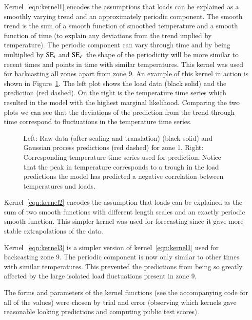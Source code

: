 \documentclass[preprint,authoryear,12pt]{elsarticle}
\newcommand{\acro}[1]{\textsc{#1}}
\def\SE{\acro{SE}}
\begin{document}
Kernel~\eqref{eqn:kernel1} encodes the assumptions that loads can be explained as a smoothly varying trend and an approximately periodic component.
The smooth trend is the sum of a smooth function of smoothed temperature and a smooth function of time (to explain any deviations from the trend implied by temperature).
The periodic component can vary through time and by being multiplied by $\SE_t$ and $\SE_T$ the shape of the periodicity will be more similar to recent times and points in time with similar temperatures.
This kernel was used for backcasting all zones apart from zone 9.
An example of this kernel in action is shown in Figure~\ref{fig:load_pred}.
The left plot shows the load data (black solid) and the prediction (red dashed).
On the right is the temperature time series which resulted in the model with the highest marginal likelihood.
Comparing the two plots we can see that the deviations of the prediction from the trend through time correspond to fluctuations in the temperature time series.

\begin{figure}[ht]
  \begin{center}
    
  \end{center}
  \caption{Left: Raw data (after scaling and translation) (black solid) and Gaussian process predictions (red dashed) for zone 1. Right: Corresponding temperature time series used for prediction. Notice that the peak in temperature corresponds to a trough in the load predictions \ie the model has predicted a negative correlation between temperatures and loads.}
  \label{fig:load_pred}
\end{figure}

Kernel~\eqref{eqn:kernel2} encodes the assumption that loads can be explained as the sum of two smooth functions with different length scales and an exactly periodic smooth function.
This simpler kernel was used for forecasting since it gave more stable extrapolations of the data.

Kernel~\eqref{eqn:kernel3} is a simpler version of kernel~\eqref{eqn:kernel1} used for backcasting zone 9.
The periodic component is now only similar to other times with similar temperatures.
This prevented the predictions from being so greatly affected by the large isolated load fluctuations present in zone 9.

The forms and parameters of the kernel functions (see the accompanying code for all of the values) were chosen by trial and error (observing which kernels gave reasonable looking predictions and computing public test scores).
\end{document}
